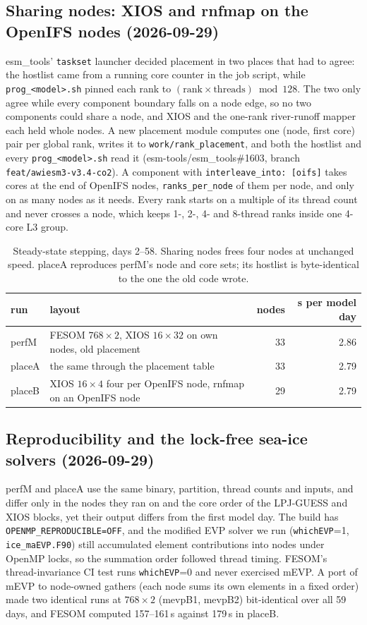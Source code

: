 \documentclass[11pt,a4paper]{article}
\begin{document}
\subsection{Sharing nodes: XIOS and rnfmap on the OpenIFS nodes (2026-09-29)}
esm\_tools' \texttt{taskset} launcher decided placement in two places that had to agree: the hostlist came from a running core counter in the job script, while \texttt{prog\_<model>.sh} pinned each rank to $(\mathrm{rank}\times\mathrm{threads}) \bmod 128$. The two only agree while every component boundary falls on a node edge, so no two components could share a node, and XIOS and the one-rank river-runoff mapper each held whole nodes. A new placement module computes one (node, first core) pair per global rank, writes it to \texttt{work/rank\_placement}, and both the hostlist and every \texttt{prog\_<model>.sh} read it (esm-tools/esm\_tools\#1603, branch \texttt{feat/awiesm3-v3.4-co2}). A component with \texttt{interleave\_into: [oifs]} takes cores at the end of OpenIFS nodes, \texttt{ranks\_per\_node} of them per node, and only on as many nodes as it needs. Every rank starts on a multiple of its thread count and never crosses a node, which keeps 1-, 2-, 4- and 8-thread ranks inside one 4-core L3 group.
\begin{table}[H]\centering\small
\begin{tabular}{llrr}\toprule
run & layout & nodes & s per model day\\\midrule
perfM & FESOM $768\times2$, XIOS $16\times32$ on own nodes, old placement & 33 & 2.86\\
placeA & the same through the placement table & 33 & 2.79\\
placeB & XIOS $16\times4$ four per OpenIFS node, rnfmap on an OpenIFS node & 29 & 2.79\\\bottomrule
\end{tabular}
\caption{Steady-state stepping, days 2--58. Sharing nodes frees four nodes at unchanged speed. placeA reproduces perfM's node and core sets; its hostlist is byte-identical to the one the old code wrote.}\label{tab:place}
\end{table}

\subsection{Reproducibility and the lock-free sea-ice solvers (2026-09-29)}
perfM and placeA use the same binary, partition, thread counts and inputs, and differ only in the nodes they ran on and the core order of the LPJ-GUESS and XIOS blocks, yet their output differs from the first model day. The build has \texttt{OPENMP\_REPRODUCIBLE=OFF}, and the modified EVP solver we run (\texttt{whichEVP}=1, \texttt{ice\_maEVP.F90}) still accumulated element contributions into nodes under OpenMP locks, so the summation order followed thread timing. FESOM's thread-invariance CI test runs \texttt{whichEVP}=0 and never exercised mEVP. A port of mEVP to node-owned gathers (each node sums its own elements in a fixed order) made two identical runs at $768\times2$ (mevpB1, mevpB2) bit-identical over all 59 days, and FESOM computed 157--161\,s against 179\,s in placeB.
\end{document}
